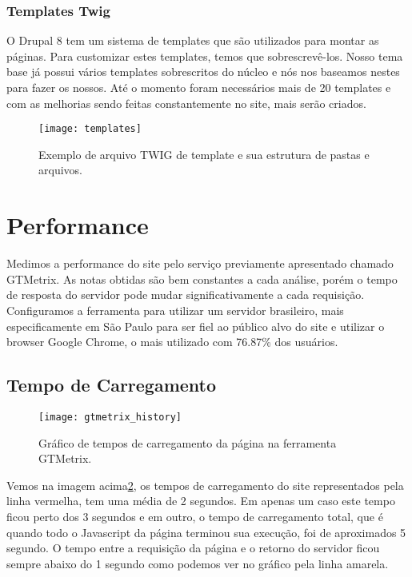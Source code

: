 \subsubsection{Templates Twig}
O Drupal 8 tem um sistema de templates que são utilizados para montar as páginas. Para customizar estes templates, temos que sobrescrevê-los. Nosso tema base já possui vários templates sobrescritos do núcleo e nós nos baseamos nestes para fazer os nossos. Até o momento foram necessários mais de 20 templates e com as melhorias sendo feitas constantemente no site, mais serão criados.

\begin{figure}[ht]
  \centering
  \texttt{[image: templates]}
  \caption{Exemplo de arquivo TWIG de template e sua estrutura de pastas e arquivos.}
  \label{templates}
\end{figure}

\section{Performance}

Medimos a performance do site pelo serviço previamente apresentado chamado GTMetrix. As notas obtidas são bem constantes a cada análise, porém o tempo de resposta do servidor pode mudar significativamente a cada requisição. Configuramos a ferramenta para utilizar um servidor brasileiro, mais especificamente em São Paulo para ser fiel ao público alvo do site e utilizar o browser Google Chrome, o mais utilizado com 76.87\%\cite{Chrome} dos usuários.

\subsection{Tempo de Carregamento}

\begin{figure}[ht]
  \centering
  \texttt{[image: gtmetrix\_history]}
  \caption{Gráfico de tempos de carregamento da página na ferramenta GTMetrix.}
  \label{gtmetrix_history}
\end{figure}

Vemos na imagem acima\ref{gtmetrix_history}, os tempos de carregamento do site representados pela linha vermelha, tem uma média de 2 segundos. Em apenas um caso este tempo ficou perto dos 3 segundos e em outro, o tempo de carregamento total, que é quando todo o Javascript da página terminou sua execução, foi de aproximados 5 segundo. O tempo entre a requisição da página e o retorno do servidor ficou sempre abaixo do 1 segundo como podemos ver no gráfico pela linha amarela.

